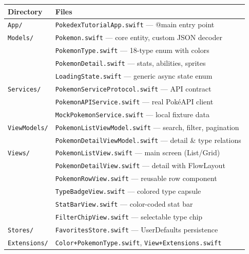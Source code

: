 \documentclass[11pt,a4paper]{article}
\begin{document}
\begin{center}
\begin{tabular}{ll}
\toprule
\textbf{Directory} & \textbf{Files} \\
\midrule
\texttt{App/} & \texttt{PokedexTutorialApp.swift} — @main entry point \\
\texttt{Models/} & \texttt{Pokemon.swift} — core entity, custom JSON decoder \\
                  & \texttt{PokemonType.swift} — 18-type enum with colors \\
                  & \texttt{PokemonDetail.swift} — stats, abilities, sprites \\
                  & \texttt{LoadingState.swift} — generic async state enum \\
\texttt{Services/} & \texttt{PokemonServiceProtocol.swift} — API contract \\
                  & \texttt{PokemonAPIService.swift} — real Pok\'{e}API client \\
                  & \texttt{MockPokemonService.swift} — local fixture data \\
\texttt{ViewModels/} & \texttt{PokemonListViewModel.swift} — search, filter, pagination \\
                  & \texttt{PokemonDetailViewModel.swift} — detail \& type relations \\
\texttt{Views/} & \texttt{PokemonListView.swift} — main screen (List/Grid) \\
                  & \texttt{PokemonDetailView.swift} — detail with FlowLayout \\
                  & \texttt{PokemonRowView.swift} — reusable row component \\
                  & \texttt{TypeBadgeView.swift} — colored type capsule \\
                  & \texttt{StatBarView.swift} — color-coded stat bar \\
                  & \texttt{FilterChipView.swift} — selectable type chip \\
\texttt{Stores/} & \texttt{FavoritesStore.swift} — UserDefaults persistence \\
\texttt{Extensions/} & \texttt{Color+PokemonType.swift}, \texttt{View+Extensions.swift} \\
\bottomrule
\end{tabular}
\end{center}

\begin{center}
\end{center}
\end{document}

